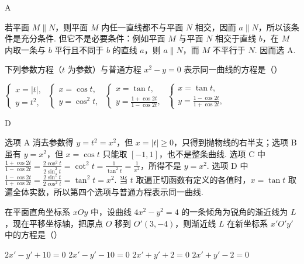 \begin{answer}
A
\end{answer}

\begin{solution}
若平面 \(M\parallel N\)，则平面 \(M\) 内任一直线都不与平面 \(N\) 相交，因而 \(a\parallel N\)，所以该条件是充分条件. 但它不是必要条件：例如平面 \(M\) 与平面 \(N\) 相交于直线 \(b\)，在 \(M\) 内取一条与 \(b\) 平行且不同于 \(b\) 的直线 \(a\)，则 \(a\parallel N\)，而 \(M\) 不平行于 \(N\). 因而选 A.
\end{solution}

\begin{problem}
下列参数方程（\(t\) 为参数）与普通方程 \(x^2 - y = 0\) 表示同一曲线的方程是（\quad）

\choices
    {\(\begin{cases}
x = |t|,\\
y = t^2,
\end{cases}\)}
    {\(\begin{cases}
x = \cos t,\\
y = \cos^2 t,
\end{cases}\)}
    {\(\begin{cases}
x = \tan t,\\
y = \frac{1 + \cos 2t}{1 - \cos 2t},
\end{cases}\)}
    {\(\begin{cases}
x = \tan t,\\
y = \frac{1 - \cos 2t}{1 + \cos 2t},
\end{cases}\)}
\end{problem}

\begin{answer}
D
\end{answer}

\begin{solution}
选项 A 消去参数得 \(y=t^2=x^2\)，但 \(x=|t|\geqslant0\)，只得到抛物线的右半支；选项 B 虽有 \(y=x^2\)，但 \(x=\cos t\) 只能取 \([-1,1]\)，也不是整条曲线. 选项 C 中
\(\frac{1+\cos2t}{1-\cos2t}=\frac{2\cos^2t}{2\sin^2t}=\cot^2t=\frac1{\tan^2t}=\frac1{x^2}\)，所得不是 \(y=x^2\). 选项 D 中
\(\frac{1-\cos2t}{1+\cos2t}=\frac{2\sin^2t}{2\cos^2t}=\tan^2t=x^2\). 当 \(t\) 取遍正切函数有定义的各值时，\(x=\tan t\) 取遍全体实数，所以第四个选项与普通方程表示同一曲线.
\end{solution}

\begin{problem}
在平面直角坐标系 \(xOy\) 中，设曲线 \(4x^2 - y^2 = 4\) 的一条倾角为锐角的渐近线为 \(L\)，现在平移坐标轴，把原点 \(O\) 移到 \(O'(3,-4)\)，则渐近线 \(L\) 在新坐标系 \(x'O'y'\) 中的方程是（\quad）

\choices
    {\(2x' - y' + 10 = 0\)}
    {\(2x' - y' - 10 = 0\)}
    {\(2x' + y' + 2 = 0\)}
    {\(2x' + y' - 2 = 0\)}
\end{problem}

